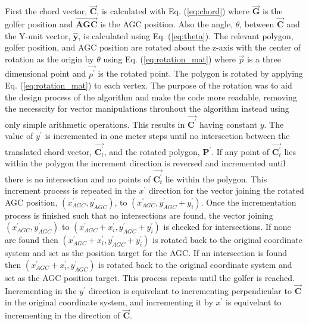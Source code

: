 \documentclass[11pt,landscape]{article}
\begin{document}
\begin{multicols}{3}
First the chord vector, $\overrightarrow{\mathbf{C}}$, is calculated with Eq.
(\ref{eq:chord}) where $\overrightarrow{\mathbf{G}}$ is the golfer position and
$\overrightarrow{\mathbf{AGC}}$ is the AGC position. Also the angle, $\theta$,
between $\overrightarrow{\mathbf{C}}$ and the Y-unit vector, $\hat{\mathbf{y}}$,
is calculated using Eq. (\ref{eq:theta}).  The relevant polygon, golfer
position, and AGC position are rotated about the z-axis with the center of
rotation as the origin by $\theta$ using Eq. (\ref{eq:rotation_mat}) where
$\overrightarrow{p}$ is a three dimensional point and
$\overrightarrow{p^\prime}$ is the rotated point. The polygon is rotated by
applying Eq. (\ref{eq:rotation_mat}) to each vertex. The purpose of the rotation
was to aid the design process of the algorithm and make the code more readable,
removing the necesscity for vector manipulations throuhout the algorithm instead
using only simple arithmetic operations. This results in
$\overrightarrow{\mathbf{C}^\prime}$ having constant $y$. The value of
$y^\prime$ is incremented in one meter steps until no intersection between the
translated chord vector, $\overrightarrow{\mathbf{C}^\prime_t}$, and the rotated
polygon, $\mathbf{P}^\prime$. If any point of
$\overrightarrow{\mathbf{C}^\prime_t}$ lies within the polygon the increment
direction is reversed and incremented until there is no intersection and no
points of $\overrightarrow{\mathbf{C}^\prime_t}$ lie within the polygon. This
increment process is repeated in the $x^\prime$ direction for the vector joining
the rotated AGC position, $\left(x^\prime_{AGC}, y^\prime_{AGC}\right)$, to
$\left(x^\prime_{AGC}, y^\prime_{AGC} + y^\prime_i\right)$. Once the
incrementation process is finished such that no intersections are found, the
vector joining $\left(x^\prime_{AGC}, y^\prime_{AGC}\right)$ to
$\left(x^\prime_{AGC}+x^\prime_i, y^\prime_{AGC} + y^\prime_i\right)$ is checked
for intersections. If none are found then $\left(x^\prime_{AGC}+x^\prime_i,
y^\prime_{AGC} + y^\prime_i\right)$ is rotated back to the original coordinate
system and set as the position target for the AGC. If an intersection is found
then $\left(x^\prime_{AGC}+x^\prime_i, y^\prime_{AGC}\right)$ is rotated back to
the original coordinate system and set as the AGC position target. This process
repeats until the golfer is reached. Incrementing in the $y^\prime$ direction is
equivelant to incrementing perpendicular to $\overrightarrow{\mathbf{C}}$ in the
original coordinate system, and incrementing it by $x^\prime$ is equivelant to
incrementing in the direction of $\overrightarrow{\mathbf{C}}$.


\end{multicols}
\end{document}
